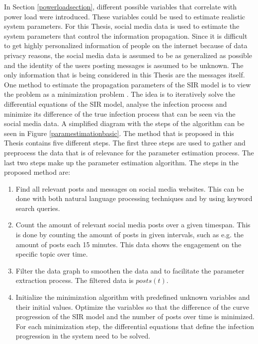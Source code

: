 In Section \ref{powerloadsection}, different possible variables that 
correlate with power load were introduced. These variables could be 
used to estimate realistic system parameters. For this Thesis, social media data is 
used to estimate the system parameters that control the 
information propagation. Since it is difficult to get highly personalized 
information of people on the internet because of data privacy reasons, the
social media data is assumed to be as generalized as possible and the identity 
of the users posting messages is assumed to be unknown. The only information
that is being considered in this Thesis are the messages itself.
One method to estimate the propagation parameters of the SIR model 
is to view the problem as a minimization problem 
\cite{jin2013epidemiological}. The idea is to iteratively solve the differential 
equations of the SIR model, analyse the infection process and minimize 
its difference of the true infection process that can be seen via the
social media data. A simplified diagram with the steps of the algorithm
can be seen in Figure \ref{paramestimationbasic}. The method that is proposed 
in this Thesis contains five different steps. 
The first three steps are used to gather and preprocess 
the data that is of relevance for the parameter estimation process.
The last two steps make up the parameter estimation algorithm.
The steps in the proposed method are:

\begin{enumerate}
    \item Find all relevant posts and messages on social media websites.
    This can be done with both natural language processing techniques and
    by using keyword search queries.
    \item Count the amount of relevant social media posts over a given 
    timespan. This is done by counting the amount of posts in given intervals, 
    such as e.g. the amount of posts each 15 minutes. This data shows the
    engagement on the specific topic over time.
    \item Filter the data graph to smoothen the data and to facilitate the
    parameter extraction process. The filtered data is $posts(t)$.
    \item Initialize the minimization algorithm with predefined unknown
    variables and their initial values. Optimize the variables
    so that the difference of the curve progression of the SIR model
    and the number of posts over time is minimized. For each minimization
    step, the differential equations that define the infection progression
    in the system need to be solved.
\end{enumerate}

